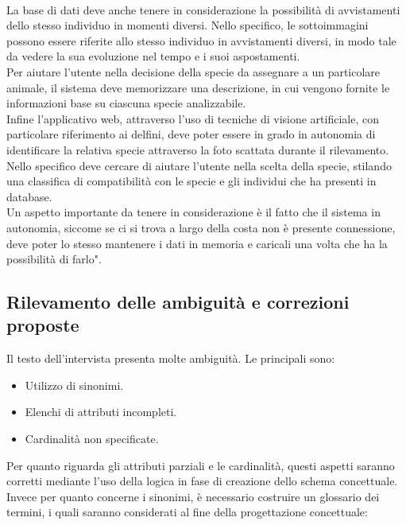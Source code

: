 \documentclass[a4paper,final,12pt]{report}
\begin{document}
\\
La base di dati deve anche tenere in considerazione la possibilità di avvistamenti dello stesso individuo in momenti diversi. Nello specifico, le sottoimmagini possono essere riferite allo stesso individuo in avvistamenti diversi, in modo tale da vedere la sua evoluzione nel tempo e i suoi aspostamenti.\\
Per aiutare l'utente nella decisione della specie da assegnare a un particolare animale, il sistema deve memorizzare una descrizione, in cui vengono fornite le informazioni base su ciascuna specie analizzabile.
\\
Infine l'applicativo web, attraverso l'uso di tecniche di visione artificiale, con particolare riferimento ai delfini, deve poter essere in grado in autonomia di identificare la relativa specie attraverso la foto scattata durante il rilevamento. Nello specifico deve cercare di aiutare l'utente nella scelta della specie, stilando una classifica di compatibilità con le specie e gli individui che ha presenti in database.
\\
Un aspetto importante da tenere in considerazione è il fatto che il sistema in autonomia, siccome se ci si trova a largo della costa non è presente connessione, deve poter lo stesso mantenere i dati in memoria e caricali una volta che ha la possibilità di farlo".

\subsection{Rilevamento delle ambiguità e correzioni proposte}
Il testo dell'intervista presenta molte ambiguità. Le principali sono:
\begin{itemize}
\item Utilizzo di sinonimi.
\item Elenchi di attributi incompleti.
\item Cardinalità non specificate.
\end{itemize}

Per quanto riguarda gli attributi parziali e le cardinalità, questi aspetti saranno corretti mediante l'uso della logica in fase di creazione dello schema concettuale. Invece per quanto concerne i sinonimi, è necessario costruire un glossario dei termini, i quali saranno considerati al fine della progettazione concettuale:
\end{document}
